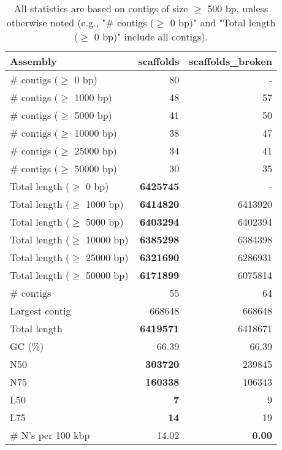\documentclass[12pt,a4paper]{article}
\begin{document}
\begin{table}[ht]
\begin{center}
\caption{All statistics are based on contigs of size $\geq$ 500 bp, unless otherwise noted (e.g., "\# contigs ($\geq$ 0 bp)" and "Total length ($\geq$ 0 bp)" include all contigs).}
\begin{tabular}{|l*{2}{|r}|}
\hline
Assembly & scaffolds & scaffolds\_broken \\ \hline
\# contigs ($\geq$ 0 bp) & 80 & - \\ \hline
\# contigs ($\geq$ 1000 bp) & 48 & 57 \\ \hline
\# contigs ($\geq$ 5000 bp) & 41 & 50 \\ \hline
\# contigs ($\geq$ 10000 bp) & 38 & 47 \\ \hline
\# contigs ($\geq$ 25000 bp) & 34 & 41 \\ \hline
\# contigs ($\geq$ 50000 bp) & 30 & 35 \\ \hline
Total length ($\geq$ 0 bp) & {\bf 6425745} & - \\ \hline
Total length ($\geq$ 1000 bp) & {\bf 6414820} & 6413920 \\ \hline
Total length ($\geq$ 5000 bp) & {\bf 6403294} & 6402394 \\ \hline
Total length ($\geq$ 10000 bp) & {\bf 6385298} & 6384398 \\ \hline
Total length ($\geq$ 25000 bp) & {\bf 6321690} & 6286931 \\ \hline
Total length ($\geq$ 50000 bp) & {\bf 6171899} & 6075814 \\ \hline
\# contigs & 55 & 64 \\ \hline
Largest contig & 668648 & 668648 \\ \hline
Total length & {\bf 6419571} & 6418671 \\ \hline
GC (\%) & 66.39 & 66.39 \\ \hline
N50 & {\bf 303720} & 239845 \\ \hline
N75 & {\bf 160338} & 106343 \\ \hline
L50 & {\bf 7} & 9 \\ \hline
L75 & {\bf 14} & 19 \\ \hline
\# N's per 100 kbp & 14.02 & {\bf 0.00} \\ \hline
\end{tabular}
\end{center}
\end{table}
\end{document}
